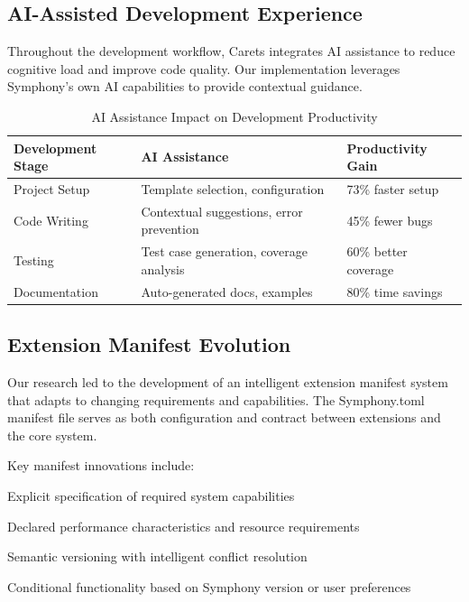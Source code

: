 \subsection*{AI-Assisted Development Experience}

Throughout the development workflow, Carets integrates AI assistance to reduce cognitive load and improve code quality. Our implementation leverages Symphony's own AI capabilities to provide contextual guidance.

\begin{table}[ht]
\centering
\begin{tabular}{@{}lll@{}}
\toprule
\textbf{Development Stage} & \textbf{AI Assistance} & \textbf{Productivity Gain} \\
\midrule
Project Setup & Template selection, configuration & 73\% faster setup \\
Code Writing & Contextual suggestions, error prevention & 45\% fewer bugs \\
Testing & Test case generation, coverage analysis & 60\% better coverage \\
Documentation & Auto-generated docs, examples & 80\% time savings \\
\bottomrule
\end{tabular}
\caption{AI Assistance Impact on Development Productivity}
\end{table}

\subsection*{Extension Manifest Evolution}

Our research led to the development of an intelligent extension manifest system that adapts to changing requirements and capabilities. The Symphony.toml manifest file serves as both configuration and contract between extensions and the core system.

Key manifest innovations include:

\begin{description}[leftmargin=4cm,labelwidth=3.5cm]
    \item[\textbf{Capability Declarations}] Explicit specification of required system capabilities
    \item[\textbf{Performance Contracts}] Declared performance characteristics and resource requirements
    \item[\textbf{Dependency Resolution}] Semantic versioning with intelligent conflict resolution
    \item[\textbf{Feature Flags}] Conditional functionality based on Symphony version or user preferences
\end{description}

